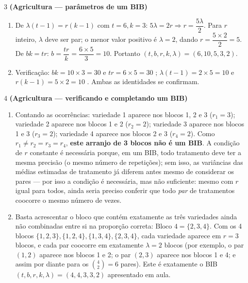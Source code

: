 \documentclass[11pt]{article}
\begin{document}
\begin{questao}{3} \textbf{(Agricultura --- parâmetros de um BIB)}
\end{questao}
\begin{solucao}
\begin{enumerate}[label=(\alph*)]
  \item De $\lambda(t-1)=r(k-1)$ com $t=6,k=3$: $5\lambda = 2r \Rightarrow r = \dfrac{5\lambda}{2}$.
    Para $r$ inteiro, $\lambda$ deve ser par; o menor valor positivo é $\lambda=2$, dando
    $r=\dfrac{5\times2}{2}=5$. De $bk=tr$: $b=\dfrac{tr}{k}=\dfrac{6\times5}{3}=10$.
    Portanto $(t,b,r,k,\lambda)=(6,10,5,3,2)$.
  \item Verificação: $bk=10\times3=30$ e $tr=6\times5=30$ \checkmark;
    $\lambda(t-1)=2\times5=10$ e $r(k-1)=5\times2=10$ \checkmark. Ambas as identidades se
    confirmam.
\end{enumerate}
\end{solucao}

\begin{questao}{4} \textbf{(Agricultura --- verificando e completando um BIB)}
\end{questao}
\begin{solucao}
\begin{enumerate}[label=(\alph*)]
  \item Contando as ocorrências: variedade 1 aparece nos blocos 1, 2 e 3 ($r_1=3$); variedade 2
    aparece nos blocos 1 e 2 ($r_2=2$); variedade 3 aparece nos blocos 1 e 3 ($r_3=2$);
    variedade 4 aparece nos blocos 2 e 3 ($r_4=2$). Como $r_1\ne r_2=r_3=r_4$, \textbf{este
    arranjo de 3 blocos não é um BIB}. A condição de $r$ constante é necessária porque, em um
    BIB, todo tratamento deve ter a mesma precisão (o mesmo número de repetições); sem isso, as
    variâncias das médias estimadas de tratamento já diferem antes mesmo de considerar os pares —
    por isso a condição é necessária, mas não suficiente: mesmo com $r$ igual para todos, ainda
    seria preciso conferir que todo \emph{par} de tratamentos coocorre o mesmo número de vezes.
  \item Basta acrescentar o bloco que contém exatamente as três variedades ainda não combinadas
    entre si na proporção correta: $\text{Bloco 4}=\{2,3,4\}$. Com os 4 blocos
    $\{1,2,3\},\{1,2,4\},\{1,3,4\},\{2,3,4\}$, cada variedade aparece em $r=3$ blocos, e cada par
    coocorre em exatamente $\lambda=2$ blocos (por exemplo, o par $(1,2)$ aparece nos blocos 1 e
    2; o par $(2,3)$ aparece nos blocos 1 e 4; e assim por diante para os $\binom{4}{2}=6$ pares).
    Este é exatamente o BIB $(t,b,r,k,\lambda)=(4,4,3,3,2)$ apresentado em aula.
\end{enumerate}
\end{solucao}
\end{document}
